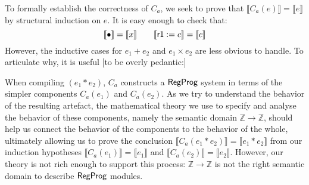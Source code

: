 {To formally establish the correctness of $C_a$,
we seek to prove that
$\llbracket C_a(e) \rrbracket = \llbracket e \rrbracket$
by structural induction on $e$.
It is easy enough to check that:
\[
  \llbracket \bullet \rrbracket = \llbracket x \rrbracket \qquad
  \llbracket  \textsf{r1}  := c \rrbracket = \llbracket c \rrbracket
\]
However,
the inductive cases for $e_1 + e_2$ and $e_1 \times e_2$
are less obvious to handle.
To articulate why,
it is useful [to be overly pedantic:]

When compiling $(e_1 * e_2)$,
$C_a$ constructs a $ \textsf{RegProg} $ system
in terms of the simpler components $C_a(e_1)$ and $C_a(e_2)$.
As we try to understand the behavior of the resulting artefact,
the mathematical theory we use to specify and analyse
the behavior of these components,
namely the semantic domain $\mathbb{Z} \rightarrow \mathbb{Z}$,
should help us connect
the behavior of the components to
the behavior of the whole,
ultimately allowing us to prove
the conclusion $\llbracket C_a(e_1 * e_2) \rrbracket = \llbracket e_1 * e_2 \rrbracket$
from our induction hypotheses
$\llbracket C_a(e_1) \rrbracket = \llbracket e_1 \rrbracket$ and
$\llbracket C_a(e_2) \rrbracket = \llbracket e_2 \rrbracket$.
However,
our theory is not rich enough to support this process:
$\mathbb{Z} \rightarrow \mathbb{Z}$
is not the right semantic domain
to describe $ \textsf{RegProg} $ modules.


} %


